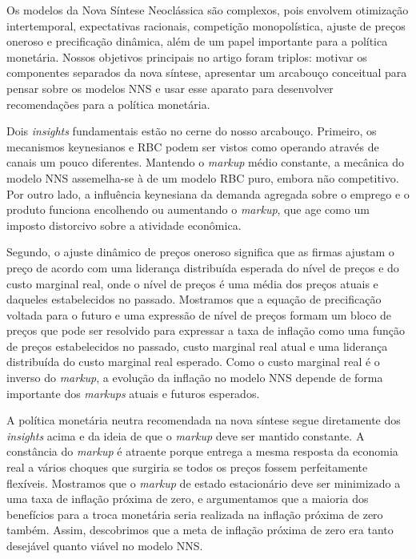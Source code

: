 \documentclass[12pt]{article}
\begin{document}
Os modelos da Nova Síntese Neoclássica são complexos, pois envolvem otimização intertemporal, expectativas racionais, competição monopolística, ajuste de preços oneroso e precificação dinâmica, além de um papel importante para a política monetária. Nossos objetivos principais no artigo foram triplos: motivar os componentes separados da nova síntese, apresentar um arcabouço conceitual para pensar sobre os modelos NNS e usar esse aparato para desenvolver recomendações para a política monetária.

Dois \textit{insights} fundamentais estão no cerne do nosso arcabouço. Primeiro, os mecanismos keynesianos e RBC podem ser vistos como operando através de canais um pouco diferentes. Mantendo o \textit{markup} médio constante, a mecânica do modelo NNS assemelha-se à de um modelo RBC puro, embora não competitivo. Por outro lado, a influência keynesiana da demanda agregada sobre o emprego e o produto funciona encolhendo ou aumentando o \textit{markup}, que age como um imposto distorcivo sobre a atividade econômica.

Segundo, o ajuste dinâmico de preços oneroso significa que as firmas ajustam o preço de acordo com uma liderança distribuída esperada do nível de preços e do custo marginal real, onde o nível de preços é uma média dos preços atuais e daqueles estabelecidos no passado. Mostramos que a equação de precificação voltada para o futuro e uma expressão de nível de preços formam um bloco de preços que pode ser resolvido para expressar a taxa de inflação como uma função de preços estabelecidos no passado, custo marginal real atual e uma liderança distribuída do custo marginal real esperado. Como o custo marginal real é o inverso do \textit{markup}, a evolução da inflação no modelo NNS depende de forma importante dos \textit{markups} atuais e futuros esperados.

A política monetária neutra recomendada na nova síntese segue diretamente dos \textit{insights} acima e da ideia de que o \textit{markup} deve ser mantido constante. A constância do \textit{markup} é atraente porque entrega a mesma resposta da economia real a vários choques que surgiria se todos os preços fossem perfeitamente flexíveis. Mostramos que o \textit{markup} de estado estacionário deve ser minimizado a uma taxa de inflação próxima de zero, e argumentamos que a maioria dos benefícios para a troca monetária seria realizada na inflação próxima de zero também. Assim, descobrimos que a meta de inflação próxima de zero era tanto desejável quanto viável no modelo NNS.
\end{document}

